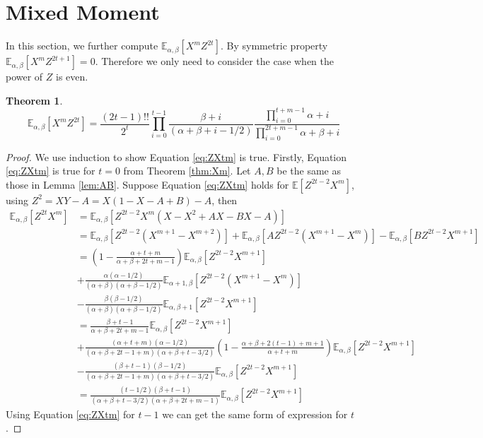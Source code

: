 \documentclass[review,authoryear]{elsarticle}
\def\E{\mathbb{E}}
\newtheorem{theorem}{Theorem}
\begin{document}
\section{Mixed Moment}
In this section, we further compute $\E_{\alpha,\beta}[X^mZ^{2t}]$.
By symmetric property  $\E_{\alpha,\beta}[X^mZ^{2t+1}] = 0$.
Therefore we only need to consider the case when the power of $Z$
is even.
\begin{theorem}\label{thm:mm}
\begin{equation}\label{eq:ZXtm}
\E_{\alpha, \beta}[X^mZ^{2t}] = \frac{(2t-1)!!}{2^t}
\prod_{i=0}^{t-1}
\frac{\beta+i}{(\alpha+\beta+i-1/2)}
\frac{\prod_{i=0}^{t+m-1}\alpha+i}{\prod_{i=0}^{2t+m-1}
\alpha+\beta+i}
\end{equation}
\end{theorem}
\begin{proof}
We use induction to show Equation \eqref{eq:ZXtm} is true.
Firstly, Equation \eqref{eq:ZXtm} is true for $t=0$ from 
Theorem \ref{thm:Xm}. Let $A, B$ be the same as those
in Lemma \ref{lem:AB}.
Suppose Equation \eqref{eq:ZXtm} holds for $\E[Z^{2t-2}X^m]$,
using $Z^2=XY-A=X(1-X-A+B)-A$, then
\begin{align*}
\E_{\alpha,\beta}[Z^{2t}X^m] &=
\E_{\alpha,\beta}[Z^{2t-2}X^m(X-X^2+AX-BX-A)] \\
&= \E_{\alpha,\beta}[Z^{2t-2}(X^{m+1} - X^{m+2})] +
\E_{\alpha,\beta}[A Z^{2t-2} (X^{m+1} - X^m)] -
\E_{\alpha,\beta}[BZ^{2t-2} X^{m+1}] \\
&= \left(1-\frac{\alpha+t+m}{\alpha+\beta+2t+m-1}
\right)\E_{\alpha, \beta}[Z^{2t-2}X^{m+1}] \\
&+
\frac{\alpha(\alpha-1/2)}{(\alpha+\beta)(\alpha+\beta-1/2)}
\E_{\alpha+1,\beta}[Z^{2t-2}(X^{m+1} - X^m)] \\
&-\frac{\beta(\beta-1/2)}{(\alpha+\beta)(\alpha+\beta-1/2)}
\E_{\alpha,\beta+1}[Z^{2t-2}X^{m+1}]\\
&=\frac{\beta+t-1}{\alpha+\beta + 2t+m-1}
\E_{\alpha,\beta}[Z^{2t-2}X^{m+1}] \\
&+\frac{(\alpha+t+m)(\alpha-1/2)}{(\alpha+\beta+2t-1+m)(\alpha+\beta + t - 3/2)}
\left(1-\frac{\alpha+\beta+2(t-1)+m+1}{\alpha+t+m}\right)
\E_{\alpha, \beta}[Z^{2t-2}X^{m+1}] \\
&-\frac{(\beta+t-1)(\beta-1/2)}{(\alpha+\beta+2t-1+m)(\alpha+\beta + t - 3/2)}
\E_{\alpha,\beta}[Z^{2t-2}X^{m+1}]\\
&=\frac{(t-1/2)(\beta+t-1)}{(\alpha+\beta+t-3/2)(\alpha+\beta+2t+m-1)}
\E_{\alpha, \beta}[Z^{2t-2}X^{m+1}]
\end{align*}
Using Equation \eqref{eq:ZXtm} for $t-1$
we can get the same form of expression for $t$.
\end{proof}
\end{document}
